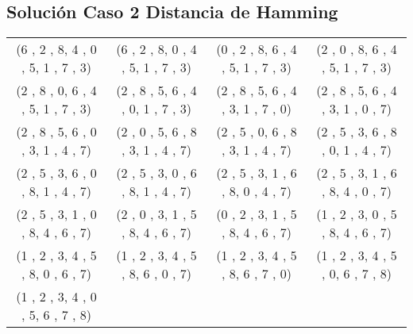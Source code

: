 \documentclass[11pt]{article}
\begin{document}
\subsection{Solución Caso 2 Distancia de Hamming}
\begin{tabular}{c c c c}
(6 , 2 , 8,
4 , 0 , 5,
1 , 7 , 3)
&

(6 , 2 , 8,
0 , 4 , 5,
1 , 7 , 3)
&

(0 , 2 , 8,
6 , 4 , 5,
1 , 7 , 3)
&

(2 , 0 , 8,
6 , 4 , 5,
1 , 7 , 3)
\\

(2 , 8 , 0,
6 , 4 , 5,
1 , 7 , 3)
&

(2 , 8 , 5,
6 , 4 , 0,
1 , 7 , 3)
&

(2 , 8 , 5,
6 , 4 , 3,
1 , 7 , 0)
&

(2 , 8 , 5,
6 , 4 , 3,
1 , 0 , 7)
\\

(2 , 8 , 5,
6 , 0 , 3,
1 , 4 , 7)
&

(2 , 0 , 5,
6 , 8 , 3,
1 , 4 , 7)
&

(2 , 5 , 0,
6 , 8 , 3,
1 , 4 , 7)
&

(2 , 5 , 3,
6 , 8 , 0,
1 , 4 , 7)
\\

(2 , 5 , 3,
6 , 0 , 8,
1 , 4 , 7)
&

(2 , 5 , 3,
0 , 6 , 8,
1 , 4 , 7)
&

(2 , 5 , 3,
1 , 6 , 8,
0 , 4 , 7)
&

(2 , 5 , 3,
1 , 6 , 8,
4 , 0 , 7)
\\

(2 , 5 , 3,
1 , 0 , 8,
4 , 6 , 7)
&

(2 , 0 , 3,
1 , 5 , 8,
4 , 6 , 7)
&

(0 , 2 , 3,
1 , 5 , 8,
4 , 6 , 7)
&

(1 , 2 , 3,
0 , 5 , 8,
4 , 6 , 7)
\\

(1 , 2 , 3,
4 , 5 , 8,
0 , 6 , 7)

&
(1 , 2 , 3,
4 , 5 , 8,
6 , 0 , 7)
&

(1 , 2 , 3,
4 , 5 , 8,
6 , 7 , 0)
&

(1 , 2 , 3,
4 , 5 , 0,
6 , 7 , 8)
\\

(1 , 2 , 3,
4 , 0 , 5,
6 , 7 , 8)

& 

&

&

\\
\end{tabular}
\clearpage
\end{document}
